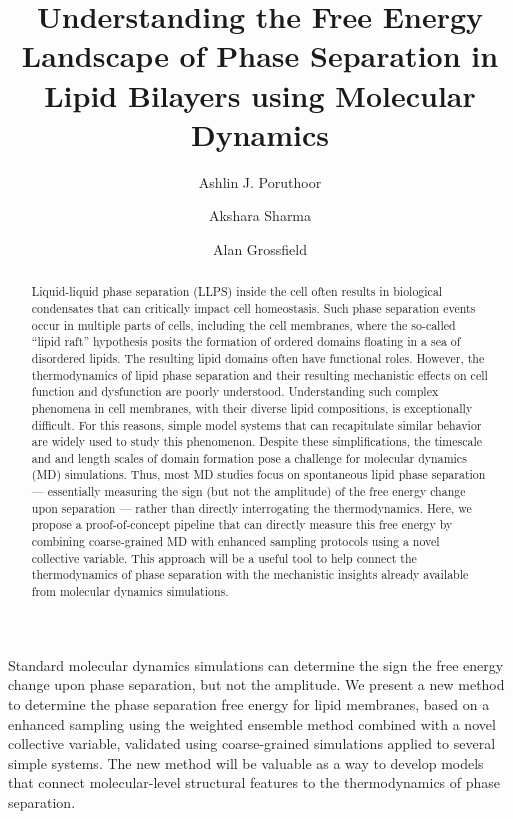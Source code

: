 \documentclass{biophys-new}
\title{Understanding the Free Energy Landscape of Phase Separation in Lipid Bilayers using Molecular Dynamics}
\author[1]{Ashlin J. Poruthoor}
\author[1]{Akshara Sharma}
\author[1,*]{Alan Grossfield}
\affil[1]{Department of Biochemistry and Biophysics, University of Rochester Medical Center, Rochester, NY 14642}
\begin{document}
\begin{frontmatter}
    \begin{abstract}

        Liquid-liquid phase separation (LLPS) inside the cell often results in biological condensates that can critically impact
        cell homeostasis. Such phase separation events occur in multiple parts of cells, including
        the cell membranes, where the so-called ``lipid raft'' hypothesis posits the formation of ordered domains floating in a sea
        of disordered lipids. The resulting lipid domains often have functional roles.
        However, the thermodynamics of lipid phase separation and their resulting
        mechanistic effects on cell function and dysfunction are poorly understood. Understanding such complex phenomena in cell
        membranes, with their diverse lipid compositions, is exceptionally difficult. For this reasons, simple model systems that can recapitulate similar behavior are
        widely used to study this phenomenon. Despite these simplifications, the timescale and and length scales of domain formation
        pose a challenge for molecular dynamics (MD) simulations.
        Thus, most MD studies focus on spontaneous lipid phase separation --- essentially measuring the sign (but not the amplitude) of the free energy change upon separation --- rather than directly interrogating the thermodynamics.  Here, we propose a proof-of-concept pipeline that can
        directly measure this free energy by combining coarse-grained MD with enhanced sampling protocols using a novel collective variable. This approach will be a useful tool to help connect the thermodynamics of phase separation with the mechanistic insights already available from molecular dynamics simulations.

    \end{abstract}

    \begin{sigstatement}

        Standard molecular dynamics simulations can determine the sign the free energy change upon phase separation, but not the amplitude. We present a new method to determine the phase separation free energy for lipid membranes, based on a enhanced sampling using the weighted ensemble method combined with a novel collective variable, validated using coarse-grained simulations applied to several simple systems. The new method will be valuable as a way to develop models that connect molecular-level structural features to the thermodynamics of phase separation.

    \end{sigstatement}

\end{frontmatter}
\end{document}

